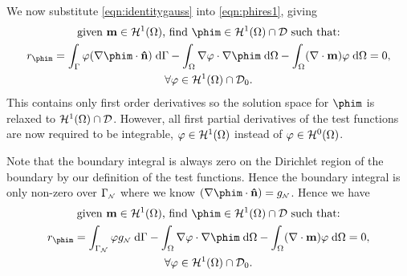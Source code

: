 We now substitute \eqref{eqn:identitygauss} into \eqref{eqn:phires1}, giving
\begin{gather}
   \text{given $\mv \in \sob^1(\magd)$, find $\phim \in \sob^1(\magd) \cap \Dfs$ such that:} \notag \\
  r_{\phim} = \int_{\boundd} \tbf (\nabla \phim \cdot \nv) \d \boundd
  - \intd{\nabla \tbf \cdot \nabla \phim}
  - \intd{(\nabla \cdot \mv) \tbf} = 0
  , \notag \\
  \forall \tbf \in \sob^1(\magd) \cap \Dfs_0. \notag
\end{gather}
This contains only first order derivatives so the solution space for $\phim$ is relaxed to $\mathcal{H}^1(\Omega) \cap \mathcal{D}$. However, all first partial derivatives of the test functions are now required to be integrable, \ie $\varphi \in \mathcal{H}^1(\Omega)$ instead of $\varphi \in \mathcal{H}^0(\Omega)$.

Note that the boundary integral is always zero on the Dirichlet region of the boundary by our definition of the test functions. Hence the boundary integral is only non-zero over ${\Gamma}_{{\scriptscriptstyle{\mathcal{N}}}}$ where we know $(\nabla \phim \cdot \nv) = g_{\Neu}$. Hence we have
\begin{gather}
   \text{given $\mv \in \sob^1(\magd)$, find $\phim \in \sob^1(\magd) \cap \Dfs$ such that:} \notag \\
  r_{\phim} = \int_{\boundd_\Neu} \tbf g_\Neu \d \boundd
  - \intd{\nabla \tbf \cdot \nabla \phim}
  - \intd{(\nabla \cdot \mv) \tbf} = 0
  , \label{res:contphi} \\
  \forall \tbf \in \sob^1(\magd) \cap \Dfs_0. \notag
\end{gather}



